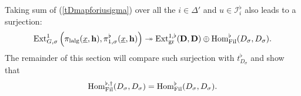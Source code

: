 \documentclass[10pt]{article}
\newcommand{\fil}{{\rm Fil}}
\newcommand{\homo}{{\rm Hom}}
\newcommand{\ext}{{\rm Ext}}
\newcommand{\lalg}{{\rm lalg}}
\newcommand{\gr}{{\rm gr}}
\newcommand{\Dpik}{{\mathbf{D}}}
\newcommand{\bh}{{\mathbf{h}}}
\newcommand{\cI}{\mathcal I}
\begin{document}
Taking sum of  (\ref{tDmapforiusigma}) over all the $i\in\Delta'$ and $u\in \cI_{i}^{\flat}$ also leads to a surjection:
\[\ext^1_{G,\sigma}\left(\pi_{\lalg}(\underline{x},\bh),\pi^{\flat}_{1,\sigma}(\underline{x},\bh)\right)\twoheadrightarrow\ext^{1,\flat}_{\gr}({\Dpik},{\Dpik})\oplus\homo^{\flat}_{\fil}(D_{\sigma},D_{\sigma}).\]
The remainder of this section will compare such surjection with $t^{\flat}_{D_{\sigma}}$ and   show that 
\[\homo^{\flat,\dagger}_{\fil}(D_{\sigma},D_{\sigma})=\homo^{\flat}_{\fil}(D_{\sigma},D_{\sigma}).\]






\end{document}
